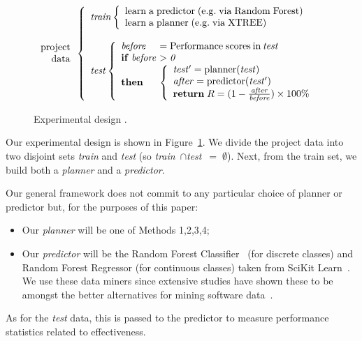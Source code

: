 \documentclass{sig-alternate}
\newcommand{\bi}{\begin{itemize}}
\newcommand{\ei}{\end{itemize}}
\newcommand{\fig}[1]{Figure~\ref{fig:#1}}
\begin{document}
 \begin{figure}[!ht]
{\small 
\[
\begin{array}{r} 
\mathrm{project}\\
\mathrm{data}
\end{array} 
\left\{\begin{array}{l}\mathit{train}
        \left\{\begin{array}{l}
                \mathrm{learn\;a\;}\mathrm{predictor\;}\mathrm{(e.g.\;via \;Random\;Forest)}\\
                \mathrm{learn\;a\;}\mathrm{planner\;}\mathrm{(e.g.\;via \; XTREE)}
              \end{array}\right.
       \\
      ~\\
\mathit{test}  
    \left\{\begin{array}{l@{~}l}
           \mathit{before}& =\mathrm{Performance\; scores \hspace{2pt} in \hspace{2pt}}\mathit{test}\\
           \mathrm{\bf if\;}\mathit{before} & >  \mathit{0}\\
           \mathrm{\bf then} &
           \left\{
            \begin{array}{l}
                \mathit{test'} = \mathrm{planner}(\mathit{test})\\
                \mathit{after} =\mathrm{predictor}(\mathit{test'})\\ 
                \mathrm{{\bf return}\;} R=(1-\frac{\mathit{after}}{\mathit{before}})\times 100 \%
            \end{array}
          \right.
   \end{array}\right.
\end{array} \right. 
\]}
 \caption{Experimental design .}\label{fig:design}
 \end{figure}

Our experimental design is shown in \fig{design}. We divide the
project data  into two disjoint sets {\em train} and {\em test}
(so \mbox{{\em train} $\cap ${\em test} $=\;\emptyset$}).
Next, from the train set, we build both a {\em planner} and
 a {\em  predictor}. 

Our general framework does not   commit to any particular choice of { planner} or { predictor} but, for the purposes of this paper:
\bi
\item Our {\em planner} will be one of Methods 1,2,3,4;
\item Our  {\em predictor} will be the Random Forest Classifier~\cite{Breiman2001} (for discrete classes) and Random Forest Regressor (for continuous classes) taken from  SciKit Learn~\cite{Pedregosa2012}.   We use these
data miners since extensive studies have shown these to be amongst the better alternatives for mining software data~\cite{lessmann}.
\ei
As for the {\em test} data, this is passed to the { predictor}
to measure performance statistics related to effectiveness. 
\end{document}
